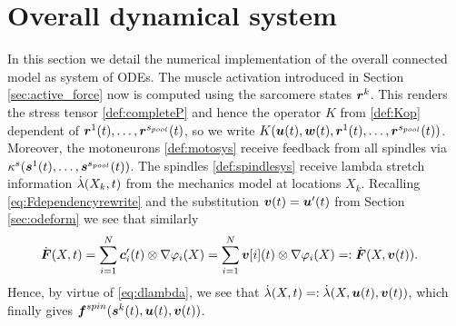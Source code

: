 \section{Overall dynamical system}
In this section we detail the numerical implementation of the overall connected model as system of ODEs.
The muscle activation introduced in Section \ref{sec:active_force} now is computed using the sarcomere states $\boldsymbol{r}^k$.
This renders the stress tensor \eqref{def:completeP} and hence the operator $K$ from \eqref{def:Kop} dependent of $\boldsymbol{r}^1(t),\ldots,\boldsymbol{r}^{s_{pool}}(t)$,
so we write $K(\boldsymbol{u}(t),\boldsymbol{w}(t),\boldsymbol{r}^1(t),\ldots,\boldsymbol{r}^{s_{pool}}(t))$.
Moreover, the motoneurons \eqref{def:motosys} receive feedback from all spindles via $\kappa^s(\boldsymbol{s}^1(t),\ldots,\boldsymbol{s}^{s_{pool}}(t))$.
The spindles \ref{def:spindlesys} receive lambda stretch information $\dot{\lambda}(X_k,t)$ from the mechanics model at locations $X_k$.
Recalling \eqref{eq:Fdependencyrewrite} and the substitution $\boldsymbol{v}(t) = \boldsymbol{u}'(t)$ from Section \ref{sec:odeform} we see that similarly
\begin{align}
	\dot{\boldsymbol{F}}(X,t) &= \sum\limits_{i=1}^{N} \boldsymbol{c}'_i(t)\otimes \nabla\varphi_i(X) = \sum\limits_{i=1}^{N} \boldsymbol{v}[i](t)\otimes \nabla\varphi_i(X) =: \dot{\boldsymbol{F}}(X,\boldsymbol{v}(t)).\label{eq:Fdotdependencyrewrite}
\end{align}
Hence, by virtue of \eqref{eq:dlambda}, we see that $\dot{\lambda}(X,t) =: \dot{\lambda}(X,\boldsymbol{u}(t),\boldsymbol{v}(t))$, which finally gives $\boldsymbol{f}^{spin}(\boldsymbol{s}^k(t),\boldsymbol{u}(t),\boldsymbol{v}(t))$.

